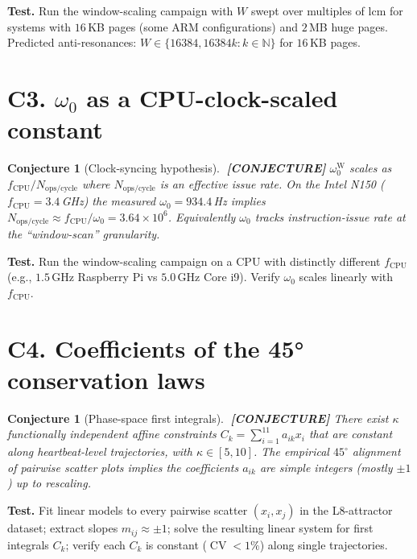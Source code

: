 \documentclass[11pt,letterpaper,openany]{book}
\theoremstyle{definition}
\theoremstyle{plain}
\newtheorem{openconjecture}[definition]{Conjecture}
\newcommand{\conjecture}{\textcolor{red!60!black}{\textbf{[CONJECTURE]}}\xspace}
\newcommand{\CV}{\operatorname{CV}}
\begin{document}
\noindent\textbf{Test.} Run the window-scaling campaign with $W$ swept
over multiples of $\mathrm{lcm}$ for systems with $16$\,KB pages
(some ARM configurations) and $2$\,MB huge pages. Predicted anti-resonances:
$W \in \{16384, 16384k : k\in\mathbb{N}\}$ for $16$\,KB pages.

\section*{C3. $\omega_0$ as a CPU-clock-scaled constant}

\begin{openconjecture}[Clock-syncing hypothesis]\label{conj:omega-clock}
$\;$\conjecture
$\omega_0^{\mathrm{W}}$ scales as $f_{\mathrm{CPU}} / N_{\mathrm{ops/cycle}}$
where $N_{\mathrm{ops/cycle}}$ is an effective issue rate. On the Intel
N150 ($f_{\mathrm{CPU}} = 3.4$\,GHz) the measured $\omega_0 = 934.4$\,Hz
implies $N_{\mathrm{ops/cycle}} \approx f_{\mathrm{CPU}}/\omega_0 = 3.64\times 10^6$.
Equivalently $\omega_0$ tracks instruction-issue rate at the
``window-scan'' granularity.
\end{openconjecture}

\noindent\textbf{Test.} Run the window-scaling campaign on a CPU with
distinctly different $f_{\mathrm{CPU}}$ (e.g., $1.5$\,GHz Raspberry Pi vs
$5.0$\,GHz Core i9). Verify $\omega_0$ scales linearly with
$f_{\mathrm{CPU}}$.

\section*{C4. Coefficients of the 45° conservation laws}

\begin{openconjecture}[Phase-space first integrals]\label{conj:noether}
$\;$\conjecture
There exist $\kappa$ functionally independent affine constraints
$C_k = \sum_{i=1}^{11} a_{ik} x_i$ that are constant along
heartbeat-level trajectories, with $\kappa \in [5, 10]$. The empirical
$45^\circ$ alignment of pairwise scatter plots implies the coefficients
$a_{ik}$ are simple integers (mostly $\pm 1$) up to rescaling.
\end{openconjecture}

\noindent\textbf{Test.} Fit linear models to every pairwise scatter
$(x_i, x_j)$ in the L8-attractor dataset; extract slopes
$m_{ij}\approx\pm 1$; solve the resulting linear system for first
integrals $C_k$; verify each $C_k$ is constant ($\CV < 1\%$) along
single trajectories.
\end{document}
